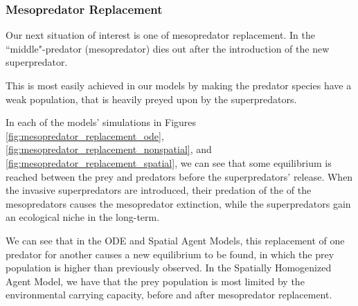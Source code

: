 \documentclass[journal]{IEEEtran}
\begin{document}
\subsubsection{Mesopredator Replacement}
Our next situation of interest is one of mesopredator replacement. In the ``middle"-predator (mesopredator) dies out after the introduction of the new superpredator.\par
This is most easily achieved in our models by making the predator species have a weak population, that is heavily preyed upon by the superpredators.\par
In each of the models' simulations in Figures \ref{fig:mesopredator_replacement_ode}, \ref{fig:mesopredator_replacement_nonspatial}, and \ref{fig:mesopredator_replacement_spatial}, we can see that some equilibrium is reached between the prey and predators before the superpredators' release. When the invasive superpredators are introduced, their predation of the of the mesopredators causes the mesopredator extinction, while the superpredators gain an ecological niche in the long-term.\par
We can see that in the ODE and Spatial Agent Models, this replacement of one predator for another causes a new equilibrium to be found, in which the prey population is higher than previously observed. In the Spatially Homogenized Agent Model, we have that the prey population is most limited by the environmental carrying capacity, before and after mesopredator replacement.
\end{document}
